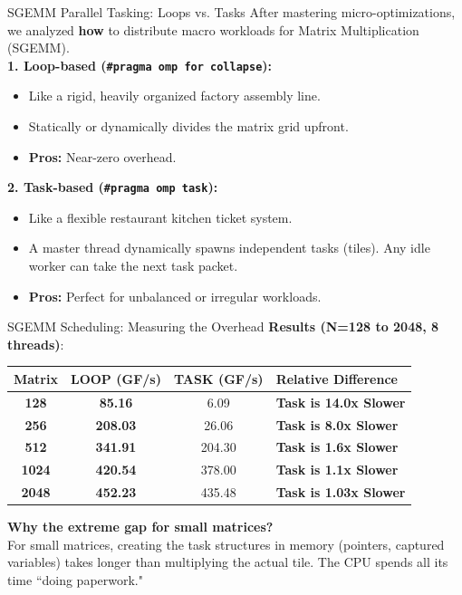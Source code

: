 \documentclass{beamer}
\begin{document}
\begin{frame}{SGEMM Parallel Tasking: Loops vs. Tasks}
    After mastering micro-optimizations, we analyzed \textbf{how} to distribute macro workloads for Matrix Multiplication (SGEMM). \\
    \vspace{0.5cm}
    \textbf{1. Loop-based (\texttt{\#pragma omp for collapse}):}
    \begin{itemize}
        \item Like a rigid, heavily organized factory assembly line.
        \item Statically or dynamically divides the matrix grid upfront. 
        \item \textbf{Pros:} Near-zero overhead.
    \end{itemize}
    \vspace{0.2cm}
    \textbf{2. Task-based (\texttt{\#pragma omp task}):}
    \begin{itemize}
        \item Like a flexible restaurant kitchen ticket system.
        \item A master thread dynamically spawns independent tasks (tiles). Any idle worker can take the next task packet. 
        \item \textbf{Pros:} Perfect for unbalanced or irregular workloads.
    \end{itemize}
\end{frame}

\begin{frame}{SGEMM Scheduling: Measuring the Overhead}
    \textbf{Results (N=128 to 2048, 8 threads)}:
    \begin{table}[]
    \centering
    \begin{tabular}{@{}c|cc|l@{}}
    \toprule
    \textbf{Matrix} & \textbf{LOOP (GF/s)} & \textbf{TASK (GF/s)} & \textbf{Relative Difference} \\ \midrule
    \textbf{128}   & \textbf{85.16}       & 6.09                 & \textbf{Task is 14.0x Slower} \\
    \textbf{256}   & \textbf{208.03}      & 26.06                & \textbf{Task is 8.0x Slower}  \\
    \textbf{512}   & \textbf{341.91}      & 204.30               & \textbf{Task is 1.6x Slower}  \\
    \textbf{1024}  & \textbf{420.54}      & 378.00               & \textbf{Task is 1.1x Slower}  \\
    \textbf{2048}  & \textbf{452.23}      & 435.48               & \textbf{Task is 1.03x Slower} \\ \bottomrule
    \end{tabular}
    \end{table}
    \vspace{0.3cm}
    \textbf{Why the extreme gap for small matrices?} \\
    For small matrices, creating the task structures in memory (pointers, captured variables) takes longer than multiplying the actual tile. The CPU spends all its time ``doing paperwork."
\end{frame}
\end{document}

